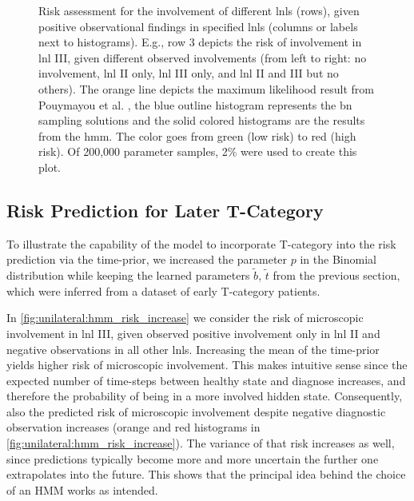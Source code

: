 \documentclass[\relativeRoot/main.tex]{subfiles}
\begin{document}
\begin{figure}
    \centering
    \def\svgwidth{1.0\textwidth}
    
    \caption[Risks for a number of scenarios, predicted both by the BN and the HMM model]{Risk assessment for the involvement of different \glspl{lnl} (rows), given positive observational findings in specified \glspl{lnl} (columns or labels next to histograms). E.g., row 3 depicts the risk of involvement in \gls{lnl} III, given different observed involvements (from left to right: no involvement, \gls{lnl} II only, \gls{lnl} III only, and \gls{lnl} II and III but no others). The orange line depicts the maximum likelihood result from Pouymayou et al. \cite{pouymayou_bayesian_2019}, the blue outline histogram represents the \gls{bn} sampling solutions and the solid colored histograms are the results from the \gls{hmm}. The color goes from green (low risk) to red (high risk). Of 200,000 parameter samples, 2\% were used to create this plot.}
    \label{fig:unilateral:hmm_bn_comp}
\end{figure}

\subsection{Risk Prediction for Later T-Category}
\label{subsec:unilateral:application:late_risk}

To illustrate the capability of the model to incorporate T-category into the risk prediction via the time-prior, we increased the parameter $p$ in the Binomial distribution while keeping the learned parameters $\tilde{b}$, $\tilde{t}$ from the previous section, which were inferred from a dataset of early T-category patients.

In \cref{fig:unilateral:hmm_risk_increase} we consider the risk of microscopic involvement in \gls{lnl} III, given observed positive involvement only in \gls{lnl} II and negative observations in all other \glspl{lnl}. Increasing the mean of the time-prior yields higher risk of microscopic involvement. This makes intuitive sense since the expected number of time-steps between healthy state and diagnose increases, and therefore the probability of being in a more involved hidden state. Consequently, also the predicted risk of microscopic involvement despite negative diagnostic observation increases (orange and red histograms in \cref{fig:unilateral:hmm_risk_increase}). The variance of that risk increases as well, since predictions typically become more and more uncertain the further one extrapolates into the future. This shows that the principal idea behind the choice of an HMM works as intended.
\end{document}
